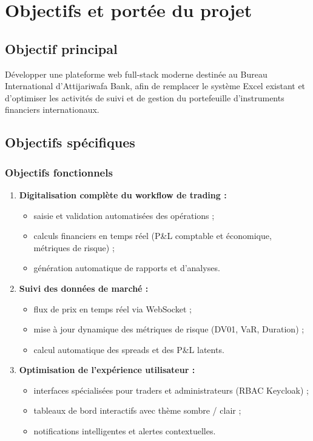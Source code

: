 \section{Objectifs et portée du projet}

\subsection{Objectif principal}

\hspace{1cm} Développer une plateforme web full-stack moderne destinée au Bureau International d'Attijariwafa Bank, afin de remplacer le système Excel existant et d'optimiser les activités de suivi et de gestion du portefeuille d'instruments financiers internationaux.

\subsection{Objectifs spécifiques}

\subsubsection{Objectifs fonctionnels}

\begin{enumerate}
    \item \textbf{Digitalisation complète du workflow de trading :}
    \begin{itemize}
        \item saisie et validation automatisées des opérations ;
        \item calculs financiers en temps réel (P\&L comptable et économique, métriques de risque) ;
        \item génération automatique de rapports et d'analyses.
    \end{itemize}
    \item \textbf{Suivi des données de marché :}
    \begin{itemize}
        \item flux de prix en temps réel via WebSocket ;
        \item mise à jour dynamique des métriques de risque (DV01, VaR, Duration) ;
        \item calcul automatique des spreads et des P\&L latents.
    \end{itemize}
    \item \textbf{Optimisation de l'expérience utilisateur :}
    \begin{itemize}
        \item interfaces spécialisées pour traders et administrateurs (RBAC Keycloak) ;
        \item tableaux de bord interactifs avec thème sombre / clair ;
        \item notifications intelligentes et alertes contextuelles.
    \end{itemize}
\end{enumerate}

